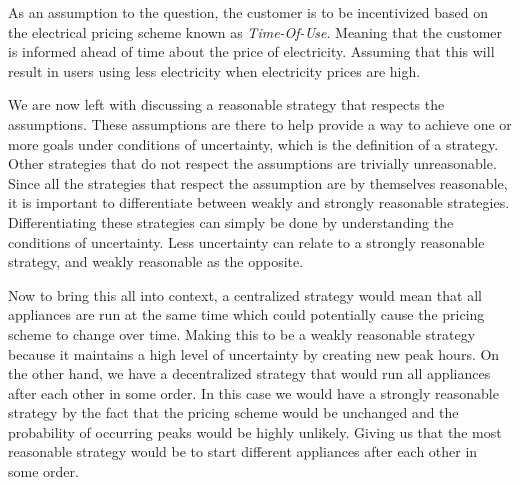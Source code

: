 \documentclass{article}
\begin{document}
	
	As an assumption to the question, the customer is to be incentivized based on the electrical pricing scheme known as \emph{Time-Of-Use}. Meaning that the customer is informed ahead of time about the price of electricity. Assuming that this will result in users using less electricity when electricity prices are high.
	
	We are now left with discussing a reasonable strategy that respects the assumptions. These assumptions are there to help provide a way to achieve one or more goals under conditions of uncertainty, which is the definition of a strategy. Other strategies that do not respect the assumptions are trivially unreasonable. Since all the strategies that respect the assumption are by themselves reasonable, it is important to differentiate between weakly and strongly reasonable strategies. Differentiating these strategies can simply be done by understanding the conditions of uncertainty. Less uncertainty can relate to a strongly reasonable strategy, and weakly reasonable as the opposite.
	
	Now to bring this all into context, a centralized strategy would mean that all appliances are run at the same time which could potentially cause the pricing scheme to change over time. Making this to be a weakly reasonable strategy because it maintains a high level of uncertainty by creating new peak hours. On the other hand, we have a decentralized strategy that would run all appliances after each other in some order. In this case we would have a strongly reasonable strategy by the fact that the pricing scheme would be unchanged and the probability of occurring peaks would be highly unlikely. Giving us that the most reasonable strategy would be to start different appliances after each other in some order.

    
    
    \printbibliography[heading=bibintoc]
\end{document}

